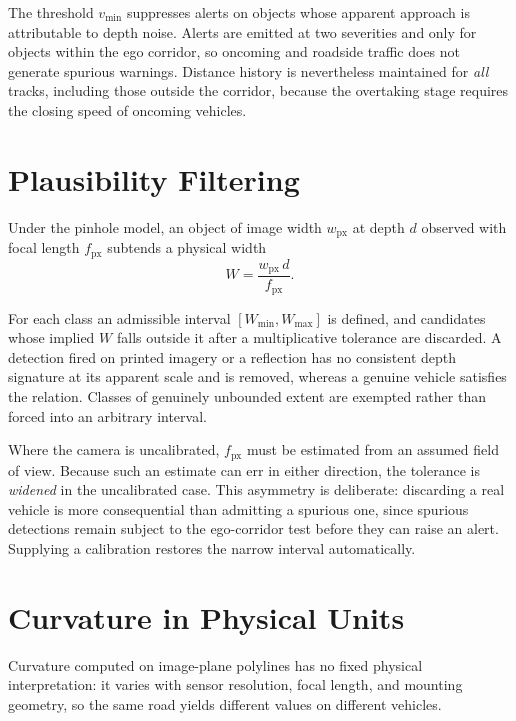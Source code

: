 \documentclass[11pt,a4paper]{report}
\begin{document}
The threshold $v_{\min}$ suppresses alerts on objects whose apparent approach is
attributable to depth noise. Alerts are emitted at two severities and only for
objects within the ego corridor, so oncoming and roadside traffic does not
generate spurious warnings. Distance history is nevertheless maintained for
\textit{all} tracks, including those outside the corridor, because the
overtaking stage requires the closing speed of oncoming vehicles.

\section{Plausibility Filtering}
\label{sec:filter}

Under the pinhole model, an object of image width $w_{\mathrm{px}}$ at depth $d$
observed with focal length $f_{\mathrm{px}}$ subtends a physical width
\begin{equation}
  W = \frac{w_{\mathrm{px}}\, d}{f_{\mathrm{px}}}.
\end{equation}

For each class an admissible interval $[W_{\min}, W_{\max}]$ is defined, and
candidates whose implied $W$ falls outside it after a multiplicative tolerance
are discarded. A detection fired on printed imagery or a reflection has no
consistent depth signature at its apparent scale and is removed, whereas a
genuine vehicle satisfies the relation. Classes of genuinely unbounded extent
are exempted rather than forced into an arbitrary interval.

Where the camera is uncalibrated, $f_{\mathrm{px}}$ must be estimated from an
assumed field of view. Because such an estimate can err in either direction, the
tolerance is \textit{widened} in the uncalibrated case. This asymmetry is
deliberate: discarding a real vehicle is more consequential than admitting a
spurious one, since spurious detections remain subject to the ego-corridor test
before they can raise an alert. Supplying a calibration restores the narrow
interval automatically.

\section{Curvature in Physical Units}

Curvature computed on image-plane polylines has no fixed physical
interpretation: it varies with sensor resolution, focal length, and mounting
geometry, so the same road yields different values on different vehicles.
\end{document}
